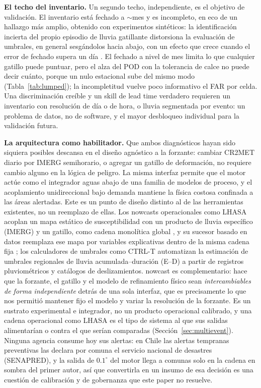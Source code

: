 \documentclass[authoryear,preprint,review,12pt]{elsarticle}
\begin{document}
\textbf{El techo del inventario.} Un segundo techo, independiente, es el objetivo
de validación. El inventario está fechado a $\sim$mes y es incompleto, en eco de un
hallazgo más amplio, obtenido con experimentos sintéticos: la identificación incierta
del propio episodio de lluvia gatillante distorsiona la evaluación de umbrales, en
general sesgándolos hacia abajo, con un efecto que crece cuando el error de fechado
supera un día \citep{peres2018}. El fechado a nivel de mes limita lo que cualquier gatillo puede
puntuar, pero el alza del POD con la tolerancia de calce no puede decir cuánto,
porque un nulo estacional sube del mismo modo (Tabla~\ref{tab:lumped}); la
incompletitud vuelve poco informativo el FAR por celda. Una discriminación creíble
y un skill de lead time verdadero requieren un inventario con resolución de día o
de hora, o lluvia segmentada por evento: un problema de datos, no de software, y el
mayor desbloqueo individual para la validación futura.

\textbf{La arquitectura como habilitador.} Que ambos diagnósticos hayan sido
siquiera posibles descansa en el diseño agnóstico a la forzante: cambiar CR2MET
diario por IMERG semihorario, o agregar un gatillo de deformación, no requiere
cambio alguno en la lógica de peligro. La misma interfaz permite que el motor actúe
como el integrador aguas abajo de una familia de modelos de proceso, y el
acoplamiento unidireccional bajo demanda mantiene la física costosa confinada a las
áreas alertadas. Este es un punto de diseño distinto al de las herramientas
existentes, no un reemplazo de ellas. Los nowcasts operacionales como LHASA
acoplan un mapa estático de susceptibilidad con un producto de lluvia específico
(IMERG) y un gatillo, como cadena monolítica global \citep{kirschbaum2018}, y su
sucesor basado en datos reemplaza ese mapa por variables explicativas dentro de la
misma cadena fija \citep{stanley2021}; los calculadores de umbrales como CTRL-T
\citep{melillo2018} automatizan la estimación de umbrales regionales de lluvia
acumulada--duración (E--D) a partir de registros pluviométricos y catálogos de
deslizamientos. nowcast es
complementario: hace que la forzante, el gatillo y el modelo de refinamiento físico
sean \emph{intercambiables de forma independiente} detrás de una sola interfaz, que
es precisamente lo que nos permitió mantener fijo el modelo y variar la resolución
de la forzante. Es un sustrato experimental e integrador, no un producto
operacional calibrado, y una cadena operacional como LHASA es el tipo de sistema al
que sus salidas alimentarían o contra el que serían comparadas (Sección~\ref{sec:multievent}).
Ninguna agencia consume hoy sus alertas: en Chile las alertas tempranas preventivas
las declara por comuna el servicio nacional de desastres (SENAPRED), y la salida de
$0.1^{\circ}$ del motor llega a comunas solo en la cadena en sombra del primer autor, así que
convertirla en un insumo de esa decisión es una cuestión de calibración y de
gobernanza que este paper no resuelve.
\end{document}
